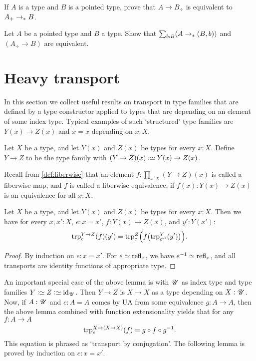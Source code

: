 \begin{xca}\label{xca:plusforgetadjoint}
If $A$ is a type and $B$ is a pointed type, 
prove that $A\to B_\div$ is equivalent to $A_+\to_\ast B$.
\end{xca}

\begin{xca}\label{xca:freemaps}
  Let $A$ be a pointed type and $B$ a type.
  Show that $\sum_{b:B}(A\to_\ast (B,b))$ and $(A_\div\to B)$ are equivalent.
\end{xca}


\section{Heavy transport}
\label{sec:heavy-transport}

In this section we collect useful results on transport in
type families that are defined by a type constructor applied
to types that are depending on an element of some index type.
Typical examples of such `structured' type families are 
$Y(x)\to Z(x)$ and $x=x$ depending on $x:X$.

\begin{definition}\label{def:function-type-families}
Let $X$ be a type, and let $Y(x)$ and $Z(x)$ be types for every $x:X$.
Define $Y\to Z$ to be the type family
with $(Y\to Z)(x) \defeq Y(x)\to Z(x)$.
\end{definition}
Recall from \cref{def:fiberwise} that an element $f : \prod_{x:X}(Y\to Z)(x)$
is called a fiberwise map,
and $f$ is called a fiberwise equivalence,
if $f(x): Y(x)\to Z(x)$ is an equivalence for all $x:X$.

\begin{lemma}\label{lem:trp-in-function-type}
Let $X$ be a type, and let $Y(x)$ and $Z(x)$ be types for every $x:X$.
Then we have for every $x,x':X$, $e: x=x'$, $f: Y(x)\to Z(x)$, and $y':Y(x')$:
\[
\trp[Y\to Z]{ e} (f)(y') = \trp[Z]{e} \Bigl(f\bigl(\trp[Y]{ e^{-1}}(y')\bigr)\Bigr).
\]
\end{lemma}
\begin{proof}
By induction on $e: x=x'$. For $e \jdeq \refl{x}$, we have $e^{-1}\jdeq \refl{x}$,
and all transports are identity functions of appropriate type. 
\end{proof}

An important special case of the above lemma is with ${\mathscr{U}}$
as index type and type families $Y\defeq Z\defeq \id_\UU$.
Then $Y\to Z$ is $X\to X$ as a type depending on $X:{\mathscr{U}}$. Now,
if $A:{\mathscr{U}}$ and $e: A=A$ comes by UA from some equivalence 
$g:A\to A$, then the above lemma combined with function extensionality 
yields that for any $f: A\to A$
\[
\trp[X \mapsto (X\to X)]{e} (f) = g\circ f \circ g^{-1}.
\]
This equation is phrased as `transport by conjugation'.
The following lemma is proved by induction on $e: x=x'$.

